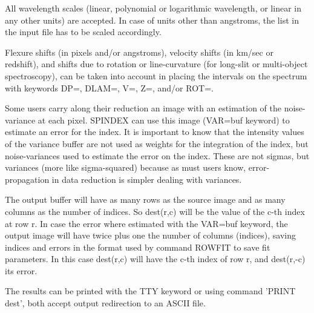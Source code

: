 All wavelength scales (linear, polynomial or logarithmic wavelength, or
linear in any other units) are accepted. In case of units other than
angstroms, the list in the input file has to be scaled accordingly.

Flexure shifts (in pixels and/or angstroms), velocity shifts (in km/sec or
redshift), and shifts due to rotation or line-curvature (for long-slit or
multi-object spectroscopy), can be taken into account in placing the
intervals on the spectrum with keywords DP=, DLAM=, V=, Z=, and/or ROT=.

Some users carry along their reduction an image with an estimation of the
noise-variance at each pixel. SPINDEX can use this image (VAR=buf keyword)
to estimate an error for the index. It is important to know that the
intensity values of the variance buffer are not used as weights for the
integration of the index, but noise-variances used to estimate the error on
the index. These are not sigmas, but variances (more like sigma-squared)
because as must users know, error-propagation in data reduction is simpler
dealing with variances.

The output buffer will have as many rows as the source image and as many
columns as the number of indices. So dest(r,c) will be the value of the
c-th index at row r. In case the error where estimated with the VAR=buf
keyword, the output image will have twice plus one the number of columns
(indices), saving indices and errors in the format used by command ROWFIT
to save fit parameters. In this case dest(r,c) will have the c-th index of
row r, and dest(r,-c) its error.

The results can be printed with the TTY keyword or using command 'PRINT
dest', both accept output redirection to an ASCII file.

